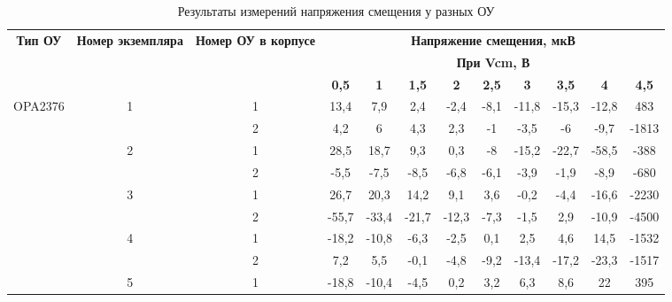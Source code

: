 \begin{table}[H]
    \begin{adjustwidth}{-1em}{}
    \centering
    \caption{Результаты измерений напряжения смещения у разных ОУ}
      \begin{tabular}{|c|c|c|c|c|c|c|c|c|c|c|c|}
      \hline
      \multicolumn{1}{|c|}{\multirow{3}[6]{2cm}{\textbf{Тип ОУ}}} & \multicolumn{1}{c|}{\multirow{3}[6]{1.4cm}{\textbf{Номер экземпляра}}} & \multicolumn{1}{c|}{\multirow{3}[6]{1.8cm}{\textbf{Номер ОУ в корпусе}}} & \multicolumn{9}{|c|}{\textbf{Напряжение смещения, мкВ}} \bigstrut\\
  \cline{4-12}          &       &       & \multicolumn{9}{|c|}{\textbf{При Vcm, В}} \bigstrut\\
  \cline{4-12}          &       &       & \textbf{0,5} & \textbf{1} & \textbf{1,5} & \textbf{2} & \textbf{2,5} & \textbf{3} & \textbf{3,5} & \textbf{4} & \textbf{4,5} \bigstrut\\
      \hline
      \multicolumn{1}{|c|}{\multirow{10}[20]{*}{OPA2376 }} & \multirow{2}[4]{*}{1} & 1     & 13,4  & 7,9   & 2,4   & -2,4  & -8,1  & -11,8 & -15,3 & -12,8 & 483 \bigstrut\\
  \cline{3-12}          &       & 2     & 4,2   & 6     & 4,3   & 2,3   & -1    & -3,5  & -6    & -9,7  & -1813 \bigstrut\\
  \cline{2-12}          & \multirow{2}[4]{*}{2} & 1     & 28,5  & 18,7  & 9,3   & 0,3   & -8    & -15,2 & -22,7 & -58,5 & -388 \bigstrut\\
  \cline{3-12}          &       & 2     & -5,5  & -7,5  & -8,5  & -6,8  & -6,1  & -3,9  & -1,9  & -8,9  & -680 \bigstrut\\
  \cline{2-12}          & \multirow{2}[4]{*}{3} & 1     & 26,7  & 20,3  & 14,2  & 9,1   & 3,6   & -0,2  & -4,4  & -16,6 & -2230 \bigstrut\\
  \cline{3-12}          &       & 2     & -55,7 & -33,4 & -21,7 & -12,3 & -7,3  & -1,5  & 2,9   & -10,9 & -4500 \bigstrut\\
  \cline{2-12}   TI     & \multirow{2}[4]{*}{4} & 1     & -18,2 & -10,8 & -6,3  & -2,5  & 0,1   & 2,5   & 4,6   & 14,5  & -1532 \bigstrut\\
  \cline{3-12}          &       & 2     & 7,2   & 5,5   & -0,1  & -4,8  & -9,2  & -13,4 & -17,2 & -23,3 & -1517 \bigstrut\\
  \cline{2-12}          & \multirow{2}[4]{*}{5} & 1     & -18,8 & -10,4 & -4,5  & 0,2   & 3,2   & 6,3   & 8,6   & 22    & 395 \bigstrut\\

\end{tabular}
\end{adjustwidth}
\end{table}
